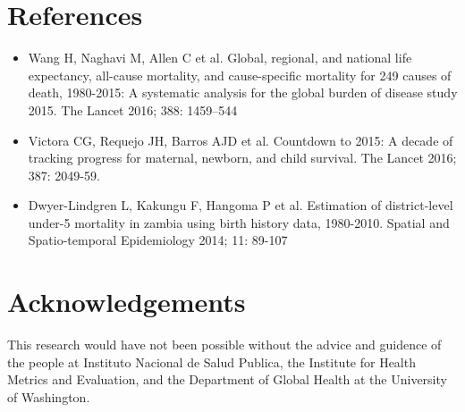 \documentclass[a0,portrait]{a0poster}
\begin{document}
\begin{multicols}{2}
\color{DarkSlateGray} %


%


\section*{References}
\begin{itemize}
\item Wang H, Naghavi M, Allen C et al. Global, regional, and national life expectancy, all-cause mortality, and cause-specific mortality for 249 causes of death, 1980-2015: A systematic analysis for the global burden of disease study 2015. The Lancet 2016; 388: 1459–544
\item Victora CG, Requejo JH, Barros AJD et al. Countdown to 2015: A decade of tracking progress for maternal, newborn, and child survival. The Lancet 2016; 387: 2049-59.
\item Dwyer-Lindgren L, Kakungu F, Hangoma P et al. Estimation of district-level under-5 mortality in zambia using birth history data, 1980-2010. Spatial and Spatio-temporal Epidemiology 2014; 11: 89-107
\end{itemize}


\section*{Acknowledgements}

This research would have not been possible without the advice and guidence of the people at Instituto Nacional de Salud Publica, the Institute for Health Metrics and Evaluation, and the Department of Global Health at the University of Washington.


\end{multicols}
\end{document}
